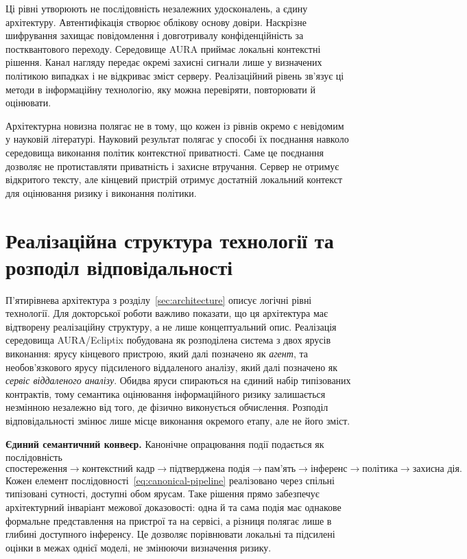 Ці рівні утворюють не послідовність незалежних удосконалень, а єдину архітектуру. Автентифікація створює облікову основу довіри. Наскрізне шифрування захищає повідомлення і довготривалу конфіденційність за постквантового переходу. Середовище AURA приймає локальні контекстні рішення. Канал нагляду передає окремі захисні сигнали лише у визначених політикою випадках і не відкриває зміст серверу. Реалізаційний рівень зв'язує ці методи в інформаційну технологію, яку можна перевіряти, повторювати й оцінювати.

Архітектурна новизна полягає не в тому, що кожен із рівнів окремо є невідомим у науковій літературі. Науковий результат полягає у способі їх поєднання навколо середовища виконання політик контекстної приватності. Саме це поєднання дозволяє не протиставляти приватність і захисне втручання. Сервер не отримує відкритого тексту, але кінцевий пристрій отримує достатній локальний контекст для оцінювання ризику і виконання політики.

\section{Реалізаційна структура технології та розподіл відповідальності}
\label{sec:realization-structure}

П'ятирівнева архітектура з розділу~\ref{sec:architecture} описує логічні рівні технології. Для докторської роботи важливо показати, що ця архітектура має відтворену реалізаційну структуру, а не лише концептуальний опис. Реалізація середовища AURA/Ecliptix побудована як розподілена система з двох ярусів виконання: ярусу кінцевого пристрою, який далі позначено як \emph{агент}, та необов'язкового ярусу підсиленого віддаленого аналізу, який далі позначено як \emph{сервіс віддаленого аналізу}. Обидва яруси спираються на єдиний набір типізованих контрактів, тому семантика оцінювання інформаційного ризику залишається незмінною незалежно від того, де фізично виконується обчислення. Розподіл відповідальності змінює лише місце виконання окремого етапу, але не його зміст.

\textbf{Єдиний семантичний конвеєр.} Канонічне опрацювання події подається як послідовність
\begin{equation}
  \text{спостереження} \rightarrow \text{контекстний кадр} \rightarrow \text{підтверджена подія} \rightarrow \text{пам'ять} \rightarrow \text{інференс} \rightarrow \text{політика} \rightarrow \text{захисна дія}.
  \label{eq:canonical-pipeline}
\end{equation}
Кожен елемент послідовності~\eqref{eq:canonical-pipeline} реалізовано через спільні типізовані сутності, доступні обом ярусам. Таке рішення прямо забезпечує архітектурний інваріант межової доказовості: одна й та сама подія має однакове формальне представлення на пристрої та на сервісі, а різниця полягає лише в глибині доступного інференсу. Це дозволяє порівнювати локальні та підсилені оцінки в межах однієї моделі, не змінюючи визначення ризику.


